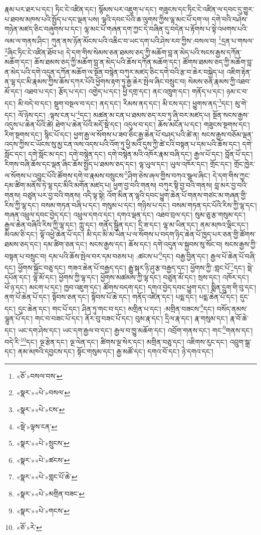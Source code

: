 རྣམ་པར་ཐར་པ་དང་། ཏིང་ངེ་འཛིན་དང་། སྙོམས་པར་འཇུག་པ་དང་། གཟུངས་དང་ཏིང་ངེ་འཛིན་ལ་དབང་དུ་གྱུར་པ་ཐབས་མཁས་པའི་སྤྱོད་པ་དང་ལྡན་པས། ལྷའི་དབང་པོའི་ཆ་ལུགས་ཀྱིས་ལྷ་མང་པོ་དག་ལ། དགེ་བའི་བཤེས་གཉེན་མཛད་ཅིང་བཞུགས་པ་དང་། ལྷ་མང་པོ་གཞན་དག་ཀྱང་དེ་བཞིན་དུ་བདེན་པ་རྟོགས་པ་སྟེ་འཕགས་པའི་ལམ་ལ་གནས་ཤིང་། ཀུན་ནས་ཉོན་མོངས་པའི་འཆིང་བ་ཡང་དག་པའི་ཤེས་རབ་ཀྱིས་:བསལ་བ། \footnote{«ཅོ་»བསལ་བས་}དྲན་པ་གསལ་\footnote{«སྣར་»«པེ་»བསལ་}ཞིང་ཏིང་ངེ་འཛིན་ཐོབ་པ། དེ་དག་གིས་སེམས་ཅན་ཐམས་ཅད་ཀྱི་མཆོག་བླ་ན་མེད་པའི་སངས་རྒྱས་དཀོན་མཆོག་དང་། ཆོས་ཐམས་ཅད་ཀྱི་མཆོག་བླ་ན་མེད་པའི་ཆོས་དཀོན་མཆོག་དང་། ཚོགས་ཐམས་ཅད་ཀྱི་མཆོག་བླ་ན་མེད་པའི་དགེ་འདུན་དཀོན་མཆོག་ལ་སྔོན་བསྙེན་བཀུར་མཛད་ཅིང་དགེ་བའི་རྩ་བ་ཆེར་བསྐྱེད་པ། འཇིག་རྟེན་ན་ལྷ་དང་མི་རྣམས་ཀྱིས་ཆོས་དཀར་པོའི་ཕྱོགས་རྟག་ཏུ་རྒྱ་ཆེར་སྤེལ་ཞིང་བསྲུང་བ། སེམས་ཅན་རྣམས་ཀྱི་འཐབ་མོ་དང་། འཐབ་པ་དང་། རྩོད་པ་དང་། འགྱེད་པ་དང་། ཕྱི་དགྲ་དང་། ནང་འཁྲུག་དང་། གནོད་པ་དང་། ཉམ་ང་བ་དང་། མི་བདེ་བ་དང་། སྡུག་བསྔལ་བ་དང་། ནད་དང་། རིམས་ནད་དང་། མི་ངས་དང་། ཕྱུགས་ནད་\footnote{«སྣར་»«པེ་»ངས་}དང་། མུ་གེ་དང་། ལོ་ཉེས་དང་། :ལྟས་ངན་པ་\footnote{«སྡེ་»ལྟས་ངན་}དང་། མཚན་མ་ངན་པ་ཐམས་ཅད་རབ་ཏུ་ཞི་བར་མཛད་པ། སྔོན་སངས་རྒྱས་འདུས་པ་ཆེན་པོའི་ཚེ། ཐེག་པ་ཆེན་པོའི་མདོ་སྡེ་དང་། འདུལ་བ་དང་། ཆོས་མངོན་པ་དང་། གཟུངས་སྔགས་དང་། རིག་སྔགས་དང་། སྙིང་པོ་དང་། ཕྱག་རྒྱ་ལ་སོགས་པ་ཟབ་ཅིང་རྒྱ་ཆེན་པོ་བཤད་པའི་ཚེ་ན། སངས་རྒྱས་བཅོམ་ལྡན་འདས་ཀྱིས་ང་ཡོངས་སུ་མྱ་ངན་ལས་འདས་པའི་འོག་ཏུ་ཕྱི་མའི་དུས་ཀྱི་ཚེ་ངའི་བསྟན་པ་དམ་པའི་ཆོས་དང་། དགེ་སློང་དང་། དགེ་སློང་མ་དང་། དགེ་བསྙེན་དང་། དགེ་བསྙེན་མའི་འཁོར་རྣམ་བཞི་དང་། རྒྱལ་པོ་དང་། བློན་པོ་དང་། རིགས་བཞི་ཆོས་དང་ལྡན་ཞིང་ཆོས་སྤྱོད་པ་ཐམས་ཅད་དང་། ལྷ་ཡུལ་དང་། ཡུལ་འཁོར་དང་། གྲོང་དང་། གྲོང་ཁྱེར་ལ་སོགས་པ་འབྱུང་པོའི་ཚོགས་དགེ་བ་རྣམས་བསྲུངས་\footnote{«སྣར་»«པེ་»སྲུངས་}ཤིག་ཅེས་ཞལ་གྱིས་བཀའ་སྩལ་ཞིང་། དེ་དག་གིས་ཀྱང་དམ་ཚིག་མནོས་ཏེ་ལྷ་དང་མིའི་མགོན་མཛད་པ། ཕྱག་བྱ་བའི་གནས། བཀུར་སྟི་བྱ་བའི་གནས། བླ་མར་བྱ་བའི་གནས། བཙུན་པར་བྱ་བའི་གནས། འདི་ལྟ་སྟེ། འོག་མིན་ན་ལྷའི་དབང་ཕྱུག་ཆེན་པོ་གནས་གཙང་མ་གཞན་གྱི་རིས་ཀྱི་ལྷ་དང་། བསམ་གཏན་བཞི་པ་དང་། གསུམ་པ་དང་། གཉིས་པ་དང་། བསམ་གཏན་དང་པོའི་རིས་ཀྱི་ལྷ་དང་། གཞན་འཕྲུལ་དབང་བྱེད་དང་། འཕྲུལ་དགའ་དང་། དགའ་ལྡན་དང་། འཐབ་བྲལ་དང་། སུམ་ཅུ་རྩ་གསུམ་དང་། རྒྱལ་ཆེན་བཞིའི་རིས་ཀྱི་ལྷ་དང་། ཀླུ་དང་། གནོད་སྦྱིན་དང་། དྲི་ཟ་དང་། ལྷ་མ་ཡིན་དང་། ནམ་མཁའ་ལྡིང་དང་། མིའམ་ཅི་དང་། ལྟོ་འཕྱེ་ཆེན་པོ་དང་། མི་དང་མི་མ་ཡིན་པ་ལ་སོགས་པ་བདག་ཉིད་ཆེན་པོ་ཁྱད་པར་ཅན་གྱི་ཚོགས་ཐམས་ཅད་དང་། དམ་ཚིག་ཅན་དང་། སངས་རྒྱས་དང་། ཆོས་དང་། དགེ་འདུན་ལ་སྐྱབས་སུ་སོང་བ། སངས་རྒྱས་ཀྱི་བསྟན་པ་བསྲུང་བ། དམ་པའི་ཆོས་སྤེལ་བར་དམ་བཅས་པ། :ཚངས་པ་\footnote{«སྣར་»«པེ་»ཚངས་}དང་། བརྒྱ་བྱིན་དང་། རྒྱལ་པོ་ཆེན་པོ་བཞི་དང་། ཕྱོགས་སྐྱོང་བཅུ་དང་། གཟའ་ཆེན་པོ་བརྒྱད་དང་། རྒྱུ་སྐར་ཉི་ཤུ་རྩ་བརྒྱད་དང་། ཕྱོགས་ཀྱི་:གླང་པོ་\footnote{«སྣར་»«པེ་»གླང་པོ་ཆེ་}དང་། སྡེ་དཔོན་དང་། ལྷ་མོ་དང་། ཕྱོགས་ཀྱི་ལྷ་དང་། ཕྱོགས་མཚམས་ཀྱི་ལྷ་དང་། བཙུན་མོ་དང་། སྲས་དང་། འཁོར་དང་། ཕོ་ཉ་དང་། མངག་པ་དང་། ཁྱབ་འཇུག་དང་། ཚོགས་བདག་དང་། དགའ་བྱེད་དབང་ཕྱུག་དང་། སྨིན་དྲུག་གི་བུ་དང་། ནག་པོ་ཆེན་པོ་དང་། སྟོབས་ཅན་དང་། སྟོབས་པོ་ཆེ་དང་། གནོད་འཛིན་དང་། པདྨ་དང་། པདྨ་ཆེན་པོ་དང་། དུང་དང་། དུང་ཆེན་དང་། གང་པོ་དང་། ཤིན་ཏུ་གང་བ་དང་། མགྲིན་པ་དང་། :མགྲིན་བཟངས་\footnote{«སྣར་»«པེ་»མགྲིན་བཟང་}དང་། བསོད་ནམས་ལྷུན་པོ་དང་། གང་བ་བཟང་པོ་དང་། ནོར་བུ་བཟང་པོ་དང་། བུམ་རྣ་དང་། དྲིལ་རྣ་དང་། རྣ་གསུམ་དང་། རྣ་བོ་ཆེ་དང་། ཡང་དག་ཤེས་དང་། ཡང་དག་རྒྱལ་བ་དང་། རྒྱལ་བ་ཁྱུ་མཆོག་དང་། འབྲོག་གནས་དང་། གང་\footnote{«སྣར་»«པེ་»གངས་}གནས་དང་། བདེ་རི་\footnote{«ཅོ་»རེ་}དང་། ལྔ་རྩེན་དང་། ལྔ་ལེན་དང་། ཚིགས་ལྔ་སེར་དང་། མགྲིན་བཅུ་དང་། འཇིགས་རུང་དང་། འབྲུག་སྒྲ་དང་། ནམ་མཁའི་དབྱངས་དང་། སྟོང་གསུམ་དང་། རྒྱ་མཚོ་དང་། དགའ་བོ་དང་། ཉེ་དགའ་དང་། 